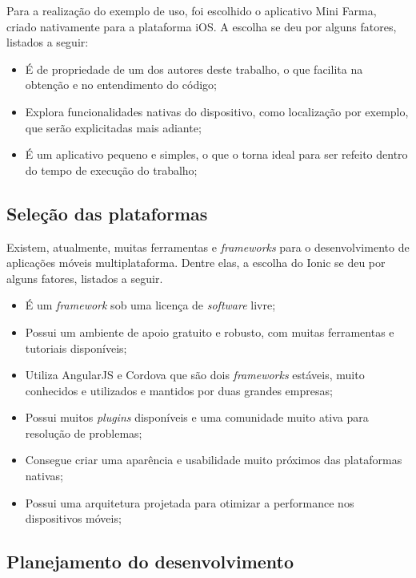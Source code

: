 Para a realização do exemplo de uso, foi escolhido o aplicativo Mini Farma, criado nativamente para a plataforma iOS. A escolha se deu por alguns fatores, listados a seguir:

\begin{itemize}
    \item É de propriedade de um dos autores deste trabalho, o que facilita na obtenção e no entendimento do código;
    \item Explora funcionalidades nativas do dispositivo, como localização por exemplo, que serão explicitadas mais adiante;
    \item É um aplicativo pequeno e simples, o que o torna ideal para ser refeito dentro do tempo de execução do trabalho;
\end{itemize}

\subsection{Seleção das plataformas} \label{subsection:selecaodasplataformas}

Existem, atualmente, muitas ferramentas e \textit{frameworks} para o desenvolvimento de aplicações móveis multiplataforma. Dentre elas, a escolha do Ionic se deu por alguns fatores, listados a seguir. 

\begin{itemize}
    \item É um \textit{framework} sob uma licença de \textit{software} livre;
    \item Possui um ambiente de apoio gratuito e robusto, com muitas ferramentas e tutoriais disponíveis;
    \item Utiliza AngularJS e Cordova que são dois \textit{frameworks} estáveis, muito conhecidos e utilizados e mantidos por duas grandes empresas;
    \item Possui muitos \textit{plugins} disponíveis e uma comunidade muito ativa para resolução de problemas; %
    \item Consegue criar uma aparência e usabilidade muito próximos das plataformas nativas; %
    \item Possui uma arquitetura projetada para otimizar a performance nos dispositivos móveis; 
\end{itemize}
 
\subsection{Planejamento do desenvolvimento} \label{subsection:planejamentodesenvolvimento}


